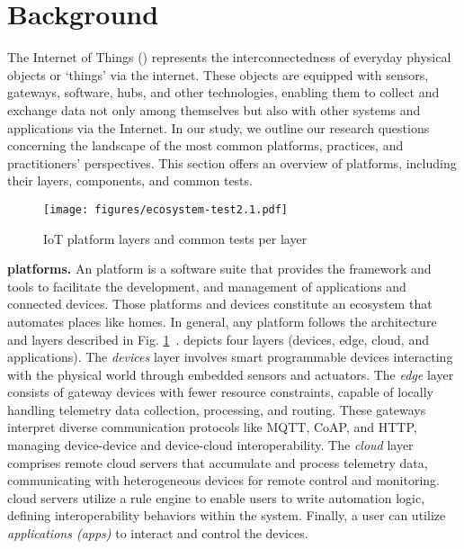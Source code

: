 \section{Background}\label{sec:bakground}

The Internet of Things (\iot) represents the interconnectedness of everyday physical objects or `things' via the internet. These objects are equipped with sensors, gateways, software, hubs, and other technologies, enabling them to collect and exchange data not only among themselves but also with other systems and applications via the Internet. In our study, we outline our research questions concerning the landscape of the most common \iot platforms, practices, and practitioners' perspectives. This section offers an overview of \iot platforms, including their layers, components, and common tests.




\begin{figure}[ht]
  \centering
  \texttt{[image: figures/ecosystem-test2.1.pdf]}
  \caption{IoT platform layers and common tests per layer \cite{makhshari2021}}
  \label{fig:iot}
\end{figure}

\textbf{\iot platforms.} An \iot platform is a software suite that provides the framework and tools to facilitate the development, and management of applications and connected devices. Those platforms and devices constitute an ecosystem that automates places like homes. In general, any \iot platform follows the architecture and layers described in Fig. \ref{fig:iot}~\cite{makhshari2021}.  depicts four layers (\ie \iot devices, edge, cloud, and applications). The \textit{\iot devices} layer involves smart programmable devices interacting with the physical world through embedded sensors and actuators. The \textit{edge} layer consists of gateway devices with fewer resource constraints, capable of locally handling telemetry data collection, processing, and routing. These gateways interpret diverse communication protocols like MQTT, CoAP, and HTTP, managing device-device and device-cloud interoperability. The \textit{cloud} layer comprises remote \iot cloud servers that accumulate and process telemetry data, communicating with heterogeneous \iot devices for remote control and monitoring. \iot cloud servers utilize a rule engine to enable users to write automation logic, defining interoperability behaviors within the \iot system. Finally, a user can utilize \textit{applications (apps)} to interact and control the \iot devices.

